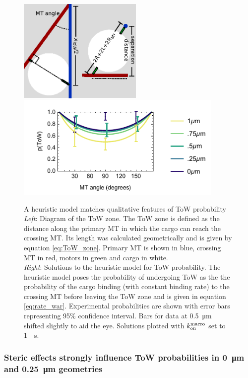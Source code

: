 \begin{figure}
\centering
\includegraphics[width=6cm]{appendix1/ToWzone}
\includegraphics[width=10cm]{appendix1/heuristicSIM.pdf}
\caption[A heuristic model matches qualitative features of ToW probability]{A heuristic model matches qualitative features of ToW probability\\
\textit{Left}: Diagram of the ToW zone. The ToW zone is defined as the distance along the primary MT in which the cargo can reach the crossing MT. Its length was calculated geometrically and is given by equation \ref{eq:ToW_zone}. Primary MT is shown in blue, crossing MT in red, motors in green and cargo in white. \\
\textit{Right}: Solutions to the heuristic model for ToW probability. The heuristic model poses the probability of undergoing ToW as the the probability of the cargo binding (with constant binding rate) to the crossing MT before leaving the ToW zone and is given in equation \ref{eq:rate_war}. Experimental probabilities are shown with error bars representing 95\% confidence interval. Bars for data at \SI{.5}{\micro\meter} shifted slightly to aid the eye. Solutions plotted with $k_\text{on}^\text{macro}$ set to \SI{1}{\per\second}. 
}
\label{fig:heuristic}
\end{figure}

\subsubsection*{Steric effects strongly influence ToW probabilities in \SI{0}{\micro\meter} and \SI{.25}{\micro\meter} geometries}

